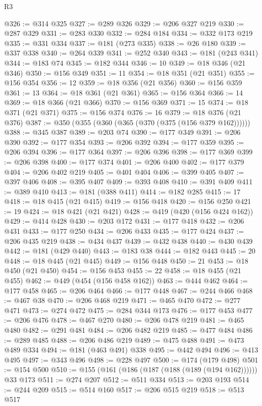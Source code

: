 \begin{lexlean}{R3}
\begin{coremodule}
@326 := @314 @325
@327 := @289 @326
@329 := @206 @327 @219
@330 := @287 @329
@331 := @283 @330
@332 := @284 @184
@334 := @332 @173 @219
@335 := @331 @334
@337 := @181 (@273 @335)
@338 := @26 @180
@339 := @337 @338
@340 := @264 @339
@341 := @252 @340
@343 := @181 (@243 @341)
@344 := @183 @74
@345 := @182 @344
@346 := 10
@349 := @18 @346 (@21 @346)
@350 := @156 @349
@351 := 11
@354 := @18 @351 (@21 @351)
@355 := @156 @354
@356 := 12
@359 := @18 @356 (@21 @356)
@360 := @156 @359
@361 := 13
@364 := @18 @361 (@21 @361)
@365 := @156 @364
@366 := 14
@369 := @18 @366 (@21 @366)
@370 := @156 @369
@371 := 15
@374 := @18 @371 (@21 @371)
@375 := @156 @374
@376 := 16
@379 := @18 @376 (@21 @376)
@387 := @350 (@355 (@360 (@365 (@370 (@375 (@156 @379 @162))))))
@388 := @345 @387
@389 := @203 @74
@390 := @177 @349
@391 := @206 @390
@392 := @177 @354
@393 := @206 @392
@394 := @177 @359
@395 := @206 @394
@396 := @177 @364
@397 := @206 @396
@398 := @177 @369
@399 := @206 @398
@400 := @177 @374
@401 := @206 @400
@402 := @177 @379
@404 := @206 @402 @219
@405 := @401 @404
@406 := @399 @405
@407 := @397 @406
@408 := @395 @407
@409 := @393 @408
@410 := @391 @409
@411 := @389 @410
@413 := @181 (@388 @411)
@414 := @182 @285
@415 := 17
@418 := @18 @415 (@21 @415)
@419 := @156 @418
@420 := @156 @250
@421 := 19
@424 := @18 @421 (@21 @421)
@428 := @419 (@420 (@156 @424 @162))
@429 := @414 @428
@430 := @203 @172
@431 := @177 @418
@432 := @206 @431
@433 := @177 @250
@434 := @206 @433
@435 := @177 @424
@437 := @206 @435 @219
@438 := @434 @437
@439 := @432 @438
@440 := @430 @439
@442 := @181 (@429 @440)
@443 := @183 @38
@444 := @182 @443
@445 := 20
@448 := @18 @445 (@21 @445)
@449 := @156 @448
@450 := 21
@453 := @18 @450 (@21 @450)
@454 := @156 @453
@455 := 22
@458 := @18 @455 (@21 @455)
@462 := @449 (@454 (@156 @458 @162))
@463 := @444 @462
@464 := @177 @458
@465 := @206 @464
@466 := @177 @448
@467 := @244 @466
@468 := @467 @38
@470 := @206 @468 @219
@471 := @465 @470
@472 := @277 @471
@473 := @274 @472
@475 := @284 @344 @173
@476 := @177 @453
@477 := @206 @476
@478 := @467 @270
@480 := @206 @478 @219
@481 := @465 @480
@482 := @291 @481
@484 := @206 @482 @219
@485 := @477 @484
@486 := @289 @485
@488 := @206 @486 @219
@489 := @475 @488
@491 := @473 @489 @334
@494 := @181 (@463 @491) @338
@495 := @442 @494
@496 := @413 @495
@497 := @343 @496
@498 := @228 @497
@500 := @174 (@179 @498)
@501 := @154 @500
@510 := @155 (@161 (@186 (@187 (@188 (@189 (@194 @162)))))) @33 @173
@511 := @274 @207
@512 := @511 @334
@513 := @203 @193
@514 := @244 @209
@515 := @514 @160
@517 := @206 @515 @219
@518 := @513 @517

\end{coremodule}
\end{lexlean}
